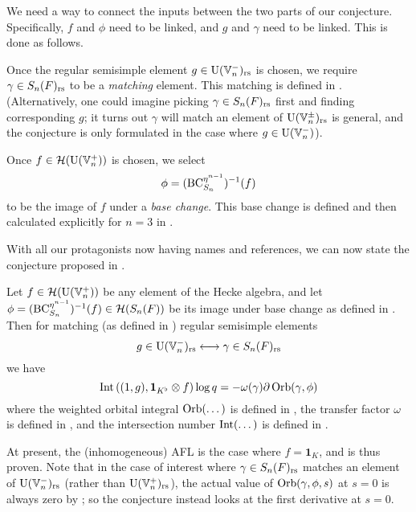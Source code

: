 \begin{itemize}
  \ii We need a way to connect the inputs between the two parts of our conjecture.
  Specifically, $f$ and $\phi$ need to be linked, and $g$ and $\gamma$ need to be linked.
  This is done as follows.
  \begin{itemize}
    \ii Once the regular semisimple element $g \in \operatorname{U}(\mathbb V_n^-)_{\mathrm{rs}}$ is chosen,
    we require $\gamma \in S_n(F)_{\mathrm{rs}}$ to be a \emph{matching} element.
    This matching is defined in .
    (Alternatively, one could imagine picking $\gamma \in S_n(F)_{\mathrm{rs}}$ first
    and finding corresponding $g$;
    it turns out $\gamma$ will match an element of $\operatorname{U}(\mathbb V_n^\pm)_{\mathrm{rs}}$ is general,
    and the conjecture is only formulated in the case where $g \in \operatorname{U}(\mathbb V_n^-)$).

    \ii Once $f \in \mathcal H(\operatorname{U}(\mathbb V_n^+))$ is chosen, we select
    \[ \phi = (\operatorname{BC}_{S_n}^{\eta^{n-1}})^{-1}(f) \]
    to be the image of $f$ under a \emph{base change}.
    This base change is defined and then calculated explicitly for $n = 3$ in .
  \end{itemize}
\end{itemize}
With all our protagonists now having names and references,
we can now state the conjecture proposed in \cite{ref:AFLspherical}.

\begin{conjecture}
  \label{conj:inhomog_spherical}
  Let $f \in \mathcal H(\operatorname{U}(\mathbb V_n^+))$ be any element of the Hecke algebra,
  and let $\phi = (\operatorname{BC}_{S_n}^{\eta^{n-1}})^{-1}(f) \in \mathcal H(S_n(F))$ be its image
  under base change as defined in .
  Then for matching (as defined in ) regular semisimple elements
  \[ g \in \operatorname{U}(\mathbb V_n^-)_{\mathrm{rs}} \longleftrightarrow \gamma \in S_n(F)_{\mathrm{rs}} \]
  we have
  \begin{equation}
    \operatorname{Int}\left( (1,g), \mathbf{1}_{K^\flat} \otimes f \right) \log q
    = -\omega(\gamma) \partial \operatorname{Orb}(\gamma, \phi)
    \label{eq:inhomog}
  \end{equation}
  where the weighted orbital integral $\operatorname{Orb}(\dots)$ is defined in ,
  the transfer factor $\omega$ is defined in ,
  and the intersection number $\operatorname{Int}(\dots)$ is defined in .
\end{conjecture}

At present, the (inhomogeneous) AFL is the case where $f = \mathbf{1}_K$,
and is thus proven.
Note that in the case of interest where $\gamma \in S_n(F)_{\mathrm{rs}}$
matches an element of $\operatorname{U}(\mathbb V_n^-)_{\mathrm{rs}}$ (rather than $\operatorname{U}(\mathbb V_n^+)_{\mathrm{rs}}$),
the actual value of $\operatorname{Orb}(\gamma, \phi, s)$ at $s = 0$ is always zero
by ;
so the conjecture instead looks at the first derivative at $s = 0$.

